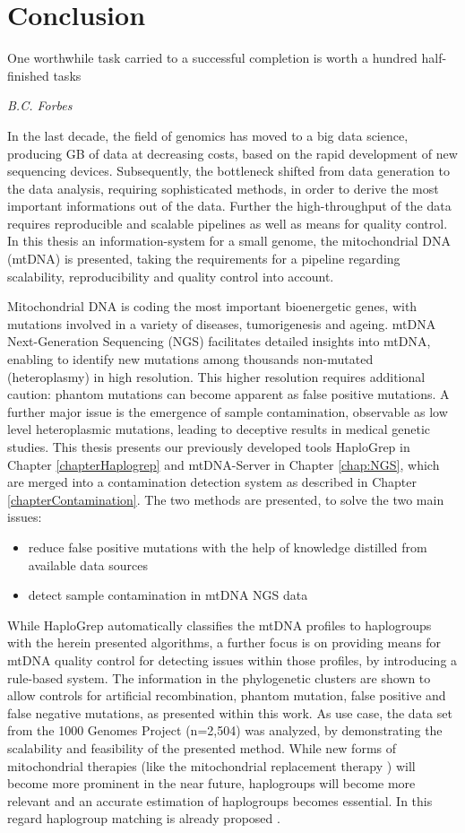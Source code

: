 \chapter{Conclusion}
\label{chap:conclusion}

\epigraph{One worthwhile task carried to a successful completion is worth a hundred half-finished tasks}{\textit{B.C. Forbes}}

In the last decade, the  field of genomics has moved to a big data science, producing GB of data at decreasing costs, based on the rapid development of new sequencing devices. Subsequently, the bottleneck shifted from data generation to the data analysis, requiring sophisticated methods, in order to derive the most important informations out of the data. Further the high-throughput of the data requires reproducible and scalable pipelines as well as means for quality control. In this thesis an information-system for a small genome, the mitochondrial DNA (mtDNA) is presented, taking the requirements for a pipeline regarding scalability, reproducibility and quality control into account. 

Mitochondrial DNA is coding the most important bioenergetic genes, with mutations involved in a variety of diseases, tumorigenesis and ageing. mtDNA Next-Generation Sequencing (NGS) facilitates detailed insights into mtDNA, enabling to identify new mutations among thousands non-mutated (heteroplasmy) in high resolution. This higher resolution requires additional caution: phantom mutations can become apparent as false positive mutations. A further major issue is the emergence of sample contamination, observable as low level heteroplasmic mutations, leading to deceptive results in medical genetic studies.
This thesis presents our previously developed tools HaploGrep in Chapter \ref{chapterHaplogrep} and mtDNA-Server in Chapter \ref{chap:NGS}, which are merged into a contamination detection system as described in Chapter \ref{chapterContamination}. The two methods are presented, to solve the two main issues:
\begin{itemize}
\item reduce false positive mutations with the help of knowledge distilled from available data sources  
\item detect sample contamination in mtDNA NGS data
\end{itemize}
While HaploGrep automatically classifies the mtDNA profiles to haplogroups with the herein presented algorithms, a further focus is on providing means for mtDNA quality control for detecting issues within those profiles, by introducing a rule-based system. The information in the phylogenetic clusters are shown to allow controls for artificial recombination, phantom mutation, false positive and false negative mutations, as presented within this work. As use case, the data set from the 1000 Genomes Project (n=2,504) was analyzed, by demonstrating the scalability and feasibility of the presented method. While new forms of mitochondrial therapies (like the mitochondrial replacement therapy \cite{Marni2016}) will become more prominent in the near future, haplogroups will become more relevant and an accurate estimation of haplogroups becomes essential. In this regard haplogroup matching is already proposed \cite{Royrvik2016}.

